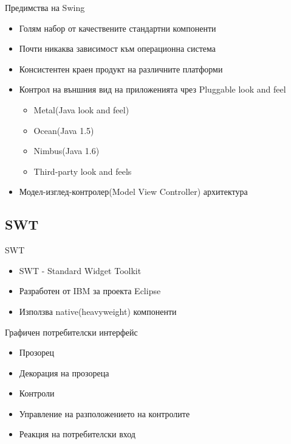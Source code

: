 \documentclass{beamer}
\begin{document}
\begin{frame}{Предимства на Swing}
  \transdissolve
  \begin{itemize}
  \item Голям набор от качествените стандартни компоненти
  \item Почти никаква зависимост към операционна система
  \item Консистентен краен продукт на различните платформи
  \item Контрол на външния вид на приложенията чрез Pluggable look and
    feel
    \begin{itemize}
      \item Metal(Java look and feel)
      \item Ocean(Java 1.5)
      \item Nimbus(Java 1.6)
      \item Third-party look and feels
    \end{itemize}
  \item Модел-изглед-контролер(Model View Controller) архитектура
  \end{itemize}
\end{frame}

\subsection{SWT}
\begin{frame}{SWT}
  \transdissolve
  \begin{itemize}
  \item SWT - Standard Widget Toolkit
  \item Разработен от IBM за проекта Eclipse
  \item Използва native(heavyweight) компоненти
  \end{itemize}
\end{frame}

\begin{frame}{Графичен потребителски интерфейс}
  \transdissolve
  \begin{itemize}
  \item Прозорец
  \item Декорация на прозореца
  \item Контроли
  \item Управление на разположението на контролите
  \item Реакция на потребителски вход
  \end{itemize}
\end{frame}
\end{document}
